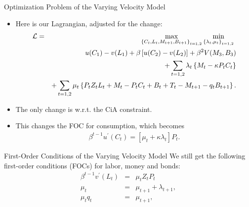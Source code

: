 \documentclass[10pt,c,aspectratio=1610,handout]{beamer}
\begin{document}
\begin{frame}{Optimization Problem of the Varying Velocity Model}%
  \begin{itemize}%
    \item[$\blacktriangleright$] Here is our Lagrangian, adjusted for the change:%
      \begin{eqnarray*}%
        \mathcal{L} & = & \max_{\left\{ C_{t},L_{t},M_{t+1},B_{t+1}\right\}_{t=1,2}}\min_{\left\{ \lambda_{t},\mu_{t}\right\}_{t=1,2}}\ \notag \\%
        && u(C_{1}) - v(L_{1}) + \beta \left[ u(C_{2}) - v(L_{2})\right] + \beta^{2} V(M_{3},B_{3}) \notag\\%
        && + \sum_{t=1,2}\lambda_{t} \left\{ M_{t} - \kappa P_{t} C_{t}\right\} \notag \\%
        && + \sum_{t=1,2} \mu_{t} \left\{ P_{t}Z_{t}L_{t}+M_{t}-P_{t}C_{t}+B_{t}+T_{t}-M_{t+1}-q_{t}B_{t+1}\right\}. \notag%
      \end{eqnarray*}%
    \pause%
    \item[$\blacktriangleright$] The only change is w.r.t. the CiA constraint.%
    \pause%
    \item[$\blacktriangleright$] This changes the FOC for consumption, which becomes%
      \begin{align*}%
        \beta^{t-1} u^{\prime} (C_{t}) = \left[ \mu_{t} + \kappa \lambda_{t} \right] P_{t}.%
      \end{align*}%
  \end{itemize}%
\end{frame}%
\begin{frame}{First-Order Conditions of the Varying Velocity Model}%
  We still get the following first-order conditions (FOCs) for labor, money and bonds:%
  \begin{eqnarray*}%
    \beta^{t-1} v^{\prime} (L_{t}) & = & \mu_{t} Z_{t} P_{t} \\%
    \mu_{t} & = & \mu_{t+1} + \lambda_{t+1}, \\%
    \mu_{t} q_{t} & = & \mu_{t+1},%
  \end{eqnarray*}%
\end{frame}%
\end{document}
